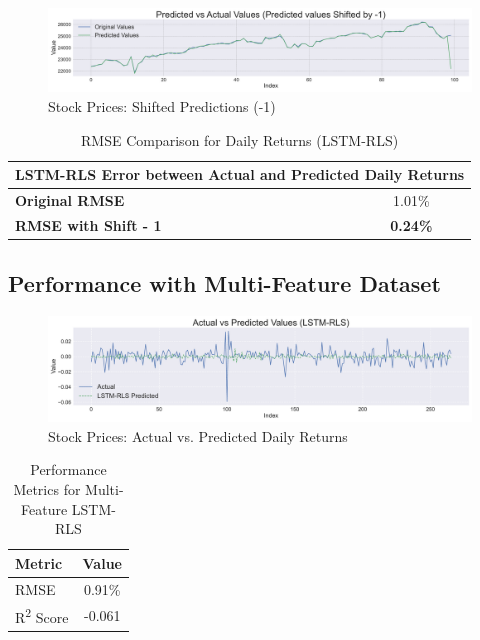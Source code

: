 \begin{figure}[h!]
    \centering
    \includegraphics[width=\textwidth]{Images/ActvsPredshift.pdf}
    \caption{Stock Prices: Shifted Predictions (-1)}
    \label{fig:revisedApproachshift1}
\end{figure}

\begin{table}[h!]
\centering
\caption{RMSE Comparison for Daily Returns (LSTM-RLS)}
\begin{tabular}{|l|c|}
\hline
\multicolumn{2}{|c|}{\textbf{LSTM-RLS Error between Actual and Predicted Daily Returns}} \\ \hline
\textbf{Original RMSE}       & 1.01\%   \\ \hline
\textbf{RMSE with Shift - 1} & \textbf{0.24\%} \\ \hline
\end{tabular}

\label{tab:lstm_rls_shift}
\end{table}

\subsection{Performance with Multi-Feature Dataset}

\begin{figure}[h!]
    \centering
    \includegraphics[width=\textwidth]{Images/5_ActvsPred_LSTM_RLS.pdf}
    \caption{Stock Prices: Actual vs. Predicted Daily Returns}
    \label{fig:actvspred_returns}
\end{figure}

\begin{table}[h!]
\centering
\caption{Performance Metrics for Multi-Feature LSTM-RLS}
\label{tab:performance_metrics}
\begin{tabular}{|l|c|}
\hline
\textbf{Metric}   & \textbf{Value}  \\ \hline
RMSE              & 0.91\%  \\ \hline
R\textsuperscript{2} Score & -0.061  \\ \hline
\end{tabular}
\end{table}

